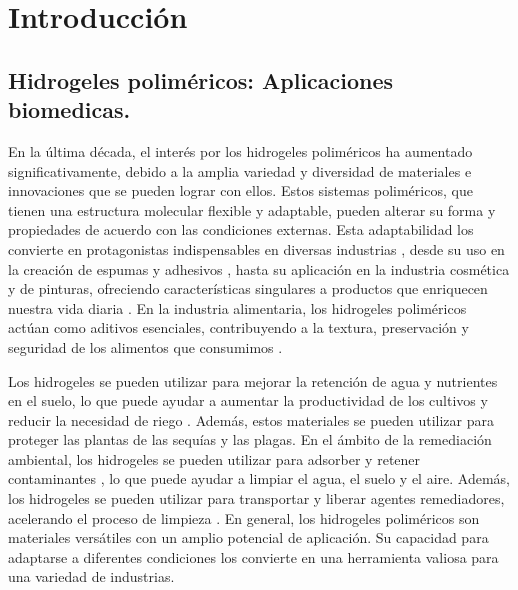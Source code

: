 
\chapter{Introducci\'on}
\label{Chapter1} %


\section{Hidrogeles polim\'ericos: Aplicaciones biomedicas.} 

En la \'ultima d\'ecada, el inter\'es por los hidrogeles polim\'ericos ha aumentado significativamente, debido a la amplia variedad y diversidad de materiales e innovaciones que se pueden lograr con ellos. Estos sistemas polim\'ericos, que tienen una estructura molecular flexible y adaptable, pueden alterar su forma y propiedades de acuerdo con las condiciones externas.
Esta adaptabilidad los convierte en protagonistas indispensables en diversas industrias \cite{zhu2022review}, desde su uso en la creaci\'on de espumas y adhesivos \cite{wu2021review, chowdhury2019novel}, hasta su aplicaci\'on en la industria cosm\'etica y de pinturas, ofreciendo caracter\'isticas singulares a productos que enriquecen nuestra vida diaria \cite{hirst2019fundamentals}.
En la industria alimentaria, los hidrogeles polim\'ericos act\'uan como aditivos esenciales, contribuyendo a la textura, preservaci\'on y seguridad de los alimentos que consumimos \cite{kwok2019microgel}.

Los hidrogeles se pueden utilizar para mejorar la retenci\'on de agua y nutrientes en el suelo, lo que puede ayudar a aumentar la productividad de los cultivos y reducir la necesidad de riego \cite{el2004radiation}. Adem\'as, estos materiales se pueden utilizar para proteger las plantas de las sequ\'ias y las plagas.
En el \'ambito de la remediaci\'on ambiental, los hidrogeles se pueden utilizar para adsorber y retener contaminantes \cite{perez2018using,perez2019molecular}, lo que puede ayudar a limpiar el agua, el suelo y el aire. Adem\'as, los hidrogeles se pueden utilizar para transportar y liberar agentes remediadores, acelerando el proceso de limpieza \cite{mehrotra2021use}.
En general, los hidrogeles polim\'ericos son materiales vers\'atiles con un amplio potencial de aplicaci\'on. Su capacidad para adaptarse a diferentes condiciones los convierte en una herramienta valiosa para una variedad de industrias.

